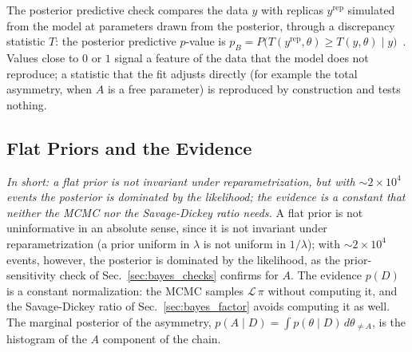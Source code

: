 The posterior predictive check compares the data $y$ with replicas $y^{\mathrm{rep}}$ simulated from the model at parameters drawn from the posterior, through a discrepancy statistic $T$: the posterior predictive $p$-value is $p_B=P\big(T(y^{\mathrm{rep}},\theta)\geq T(y,\theta)\mid y\big)$~\cite{gelman_ppc}. Values close to $0$ or $1$ signal a feature of the data that the model does not reproduce; a statistic that the fit adjusts directly (for example the total asymmetry, when $A$ is a free parameter) is reproduced by construction and tests nothing.

\subsection{Flat Priors and the Evidence}
\emph{In short: a flat prior is not invariant under reparametrization, but with $\sim2\times10^4$ events the posterior is dominated by the likelihood; the evidence is a constant that neither the MCMC nor the Savage-Dickey ratio needs.}
A flat prior is not uninformative in an absolute sense, since it is not invariant under reparametrization (a prior uniform in $\lambda$ is not uniform in $1/\lambda$); with $\sim$$2\times10^4$ events, however, the posterior is dominated by the likelihood, as the prior-sensitivity check of Sec.~\ref{sec:bayes_checks} confirms for $A$. The evidence $p(D)$ is a constant normalization: the MCMC samples $\mathcal{L}\,\pi$ without computing it, and the Savage-Dickey ratio of Sec.~\ref{sec:bayes_factor} avoids computing it as well. The marginal posterior of the asymmetry, $p(A\mid D)=\int p(\theta\mid D)\,d\theta_{\neq A}$, is the histogram of the $A$ component of the chain.

